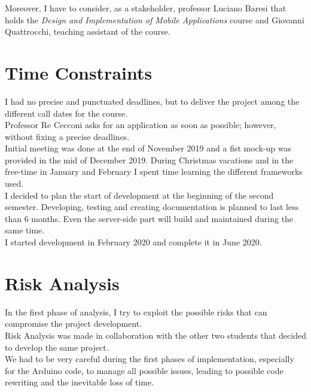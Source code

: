 Moreover, I have to consider, as a stakeholder, professor Luciano Baresi that holds the \textit{Design and Implementation of Mobile Applications} course and Giovanni Quattrocchi, teaching assistant of the course.

\section{Time Constraints}
I had no precise and punctuated deadlines, but to deliver the project among the different call dates for the course.\\

Professor Re Cecconi asks for an application as soon as possible; however, without fixing a precise deadlines.\\

Initial meeting was done at the end of November 2019 and a fist mock-up was provided in the mid of December 2019. During Christmas vacations and in the free-time in January and February I spent time learning the different frameworks used.\\
I decided to plan the start of development at the beginning of the second semester. Developing, testing and creating documentation is planned to last less than 6 months. Even the server-side part will build and maintained during the same time.\\

I started development in February 2020 and complete it in June 2020.

\section{Risk Analysis}
In the first phase of analysis, I try to exploit the possible risks that can compromise the project development.\\

Risk Analysis was made in collaboration with the other two students that decided to develop the same project.\\

We had to be very careful during the first phases of implementation, especially for the Arduino code, to manage all possible issues, leading to possible code rewriting and the inevitable loss of time.

